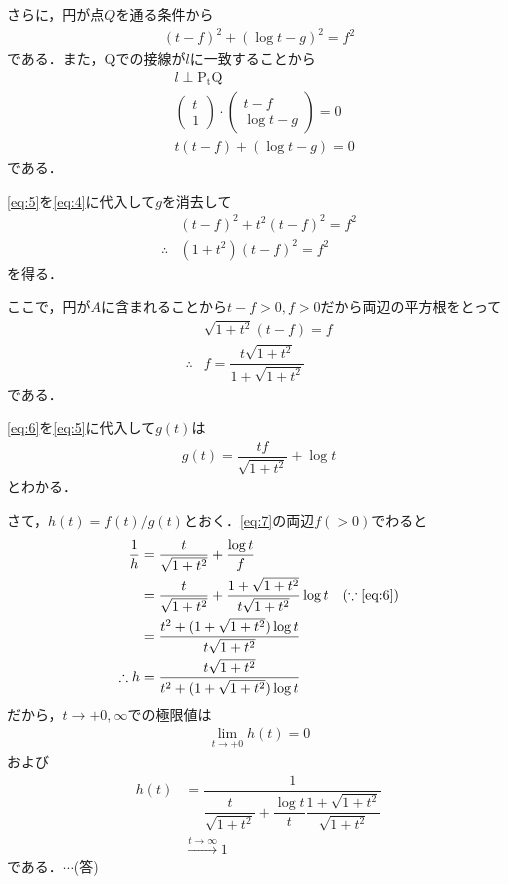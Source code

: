 \documentclass[../../main.tex]{subfiles}
\begin{document}
さらに，円が点$Q$を通る条件から
\begin{align}
  (t-f)^2+(\log t-g)^2=f^2 \label{eq:4}
\end{align}
である．また，Qでの接線が$l$に一致することから
\begin{align}
  &l \perp\mathrm{P_tQ} \\
  &
  \begin{pmatrix}t\\1
  \end{pmatrix}\cdot
  \begin{pmatrix}t-f\\\log t-g
  \end{pmatrix}=0 \\
  &t(t-f)+(\log t-g)=0 \label{eq:5}
\end{align}
である．

\cref{eq:5}を\cref{eq:4}に代入して$g$を消去して
\begin{align}
  &(t-f)^2+t^2(t-f)^2=f^2 \\
  \therefore
  &(1+t^2)(t-f)^2=f^2
\end{align}
を得る．

ここで，円が$A$に含まれることから$t-f>0, f>0$だから両辺の平方根をとって
\begin{align}
  &\sqrt{1+t^2}(t-f)=f \\
  \therefore
  &f=\dfrac{t\sqrt{1+t^2}}{1+\sqrt{1+t^2}} \label{eq:6}
\end{align}
である．

\cref{eq:6}を\cref{eq:5}に代入して$g(t)$は
\begin{align}
  g(t)=\dfrac{tf}{\sqrt{1+t^2}}+\log t\label{eq:7}
\end{align}
とわかる．

さて，$h(t)=f(t)/g(t)$とおく．\cref{eq:7}の両辺$f(>0)$でわると
\begin{align}
  \dfrac{1}{h}
  &=\dfrac{t}{\sqrt{1+t^2}}+\dfrac{\log t}{f} \\
  &=\dfrac{t}{\sqrt{1+t^2}}+\dfrac{1+\sqrt{1+t^2}}{t\sqrt{1+t^2}}\log t \quad (\because \text{\cref{eq:6}}) \\
  &=\dfrac{t^2+(1+\sqrt{1+t^2})\log t}{t\sqrt{1+t^2}} \\
  \therefore
  h&=\dfrac{t\sqrt{1+t^2}}{t^2+(1+\sqrt{1+t^2})\log t}
\end{align}
だから，$t\to +0,\infty$での極限値は
\begin{align}
  \lim_{t\to +0}h(t) = 0
\end{align}
および
\begin{align}
  h(t)
  &=\dfrac{1}{\dfrac{t}{\sqrt{1+t^2}}+\dfrac{\log t}{t}\dfrac{1+\sqrt{1+t^2}}{\sqrt{1+t^2}}} \\
  &\xrightarrow{t\to\infty}1
\end{align}
である．$\cdots$(答)
\newpage
\end{document}
